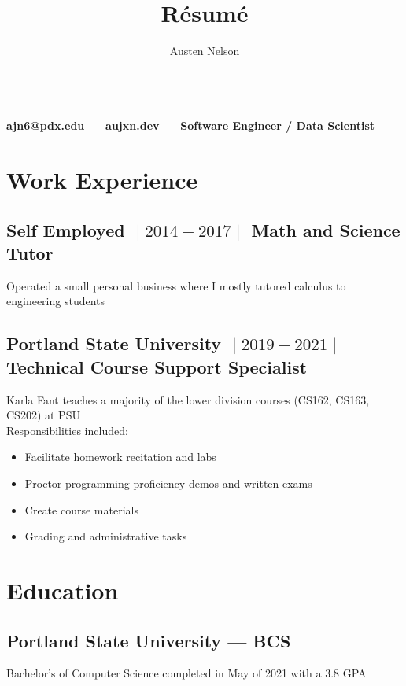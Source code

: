 \documentclass{article}
\title{R\'esum\'e}
\author{Austen Nelson}
\makeatletter
\renewcommand{\maketitle}
{
\begin{center}
\huge \bfseries \theauthor\\
\vspace{.25em}
\mdseries \normalsize ajn6@pdx.edu --- aujxn.dev --- Software Engineer / Data Scientist
\end{center}
}
\makeatother
\begin{document}
\maketitle

\section{Work Experience}

\subsection{Self Employed $\;\vert\;2014-2017\;\vert\;$ Math and Science Tutor}
Operated a small personal business where I mostly tutored calculus to
engineering students

\subsection{Portland State University $\;\vert\;2019-2021\;\vert\;$ Technical Course Support Specialist}
Karla Fant teaches a majority of the lower division courses (CS162, CS163, CS202) at PSU\\
Responsibilities included:

\begin{itemize}
\item Facilitate homework recitation and labs
\item Proctor programming proficiency demos and written exams
\item Create course materials
\item Grading and administrative tasks
\end{itemize}

\section{Education}

\subsection{Portland State University --- BCS}
Bachelor's of Computer Science completed in May of 2021 with a 3.8 GPA
\end{document}
